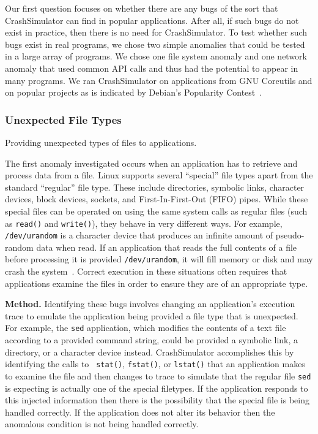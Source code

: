 Our first question focuses on whether there are any bugs of the sort that
CrashSimulator can find in popular applications.  After all, if such bugs
do not exist in practice, then there is no need for CrashSimulator.
To test whether such bugs exist in real programs, we 
chose two simple anomalies that could be tested in a large
array of programs.  We chose one file system anomaly and one network anomaly 
that used common API calls and thus had the potential to appear in
many programs.  We ran CrashSimulator on applications from GNU Coreutils and
on popular projects as is indicated by Debian's Popularity Contest~\cite{DebPopCon}.

\subsubsection{Unexpected File Types} Providing unexpected types of files to
applications.

The first anomaly investigated occurs when an
application has to retrieve and process data from a file.  Linux supports
several ``special'' file types apart from the standard ``regular'' file type.
These include directories, symbolic links, character devices, block devices,
sockets, and First-In-First-Out (FIFO) pipes.  While these special files can
be operated on using the same system calls as regular files 
(such as {\tt read()} and {\tt write()}), they behave in very different
ways.  For example, {\tt /dev/urandom} is a character device that produces
an infinite amount of pseudo-random data when read.
If an application that reads the full contents of a file
before processing it is provided {\tt /dev/urandom}, it will fill memory
or disk and may crash the system~\cite{YumAptEndless}.
Correct execution in these situations
often requires that applications 
examine the files in order to ensure they are of an appropriate type.

{\bf Method.}  Identifying these bugs involves changing an application's
execution trace to emulate the application being provided a file type that is
unexpected.  For example, the {\tt sed} application, which modifies the contents
of a text file according to a provided command string, could be provided
a symbolic link, a directory, or a character device
instead.  CrashSimulator accomplishes this by identifying the calls to {\tt
  stat()}, {\tt fstat()}, or {\tt lstat()} that an application makes to examine
the file and then changes to trace to simulate that the regular file {\tt sed}
is expecting is actually one of the special filetypes.  If the application
responds to this injected information then there is the possibility that the
special file is being handled correctly.  If the application does not alter its
behavior then the anomalous condition is not being handled correctly.

